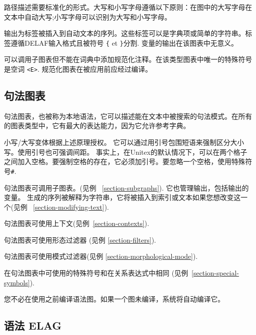 \noindent 
路径描述需要标准化的形式。大写和小写字母遵循以下原则：在图中的大写字母在文本中自动大写;小写字母可以识别为大写和小写字母。

\bigskip
\noindent 输出为标签被插入到自动文本的序列。这些标签可以是字典项或简单的字符串。标签遵循DELAF输入格式且被符号
\verb+{+ et \verb+}+分割. 变量的输出在该图表中无意义。


\bigskip
\noindent 可以调用子图表但不能在词典中添加规范化注释。在该类型图表中唯一的特殊符号是空词 \verb+<E>+.
规范化图表在被应用前应经过编译。


\subsection{句法图表}
\label{syntactic-graphs}
句法图表，也被称为本地语法，它可以描述能在文本中被搜索的句法模式。在所有的图表类型中，它有最大的表达能力，因为它允许参考字典。

\bigskip
\noindent 小写/大写变体根据上述原理授权。
它可以通过用引号包围短语来强制区分大小写。使用引号也可强调间距。
事实上，在Unitex的默认情况下，可以在两个格子之间加入空格。要强制空格的存在，它必须加引号。要忽略一个空格，使用特殊符号\verb+#+.\index{\verb+#+}

\bigskip
\noindent 句法图表可调用子图表。(见例
~\ref{section-subgraphs}). 它也管理输出，包括输出的变量。
生成的序列被解释为字符串，它将被插入到索引或文本如果您想改变这一个(见例
~\ref{section-modifying-text}).

\bigskip
\noindent 句法图表可使用上下文(见例~\ref{section-contexts}).

\bigskip
\noindent 句法图表可使用形态过滤器 (见例
\ref{section-filters}).

\bigskip
\noindent 句法图表可使用模式过滤器(见例
\ref{section-morphological-mode}).

\bigskip
\noindent 在句法图表中可使用的特殊符号和在关系表达式中相同 (见例~\ref{section-special-symbols}).

\bigskip
\noindent 您不必在使用之前编译语法图。如果一个图未编译，系统将自动编译它。


\subsection{语法 ELAG}

